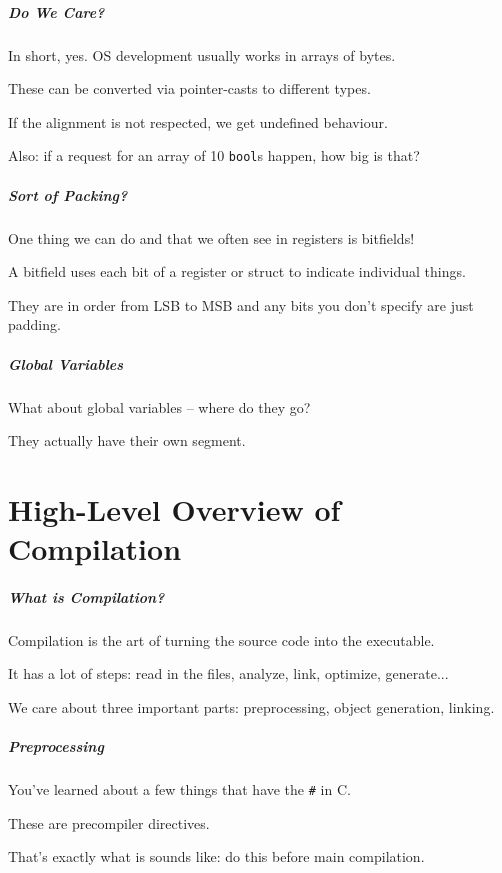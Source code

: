 \begin{frame}
\frametitle{Do We Care?}

In short, yes. OS development usually works in arrays of bytes.

These can be converted via pointer-casts to different types.

If the alignment is not respected, we get undefined behaviour.

Also: if a request for an array of 10 \texttt{bool}s happen, how big is that?

\end{frame}

\begin{frame}
\frametitle{Sort of Packing?}

One thing we can do and that we often see in registers is bitfields!

A bitfield uses each bit of a register or struct to indicate individual things.

They are in order from LSB to MSB and any bits you don't specify are just padding. 

\end{frame}

\begin{frame}
\frametitle{Global Variables}

What about global variables -- where do they go?

They actually have their own segment. 

\end{frame}

\part{High-Level Overview of Compilation}

\begin{frame}
\partpage
\end{frame}

\begin{frame}
\frametitle{What is Compilation?}

Compilation is the art of turning the source code into the executable.

It has a lot of steps: read in the files, analyze, link, optimize, generate...

We care about three important parts: preprocessing, object generation, linking.

\end{frame}

\begin{frame}
\frametitle{Preprocessing}

You've learned about a few things that have the \texttt{\#} in C.

These are \alert{precompiler directives}. 

That's exactly what is sounds like: do this before main compilation.

\end{frame}

